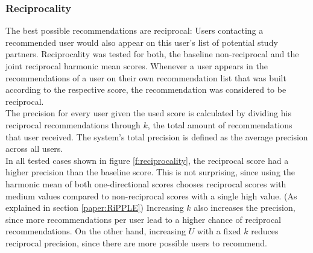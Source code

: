 \documentclass[conference]{IEEEtran}
\begin{document}
\subsubsection{Reciprocality} \label{paper:reciprocality}
The best possible recommendations are reciprocal: Users contacting a recommended user would also appear on this user's list of potential study partners. \cite{prabhakar2017reciprocal} Reciprocality was tested for both, the baseline non-reciprocal and the joint reciprocal harmonic mean scores. Whenever a user appears in the recommendations of a user on their own recommendation list that was built according to the respective score, the recommendation was considered to be reciprocal.\\
The precision for every user given the used score is calculated by dividing his reciprocal recommendations through \(k\), the total amount of recommendations that user received. The system's total precision is defined as the average precision across all users. \cite{prabhakar2017reciprocal}\\ 
In all tested cases shown in figure \ref{f:reciprocality}, the reciprocal score had a higher precision than the baseline score. This is not surprising, since using the harmonic mean of both one-directional scores chooses reciprocal scores with medium values compared to non-reciprocal scores with a single high value. (As explained in section \ref{paper:RiPPLE}) Increasing \(k\) also increases the precision, since more recommendations per user lead to a higher chance of reciprocal recommendations. On the other hand, increasing \(U\) with a fixed \(k\) reduces reciprocal precision, since there are more possible users to recommend.\\
\end{document}
